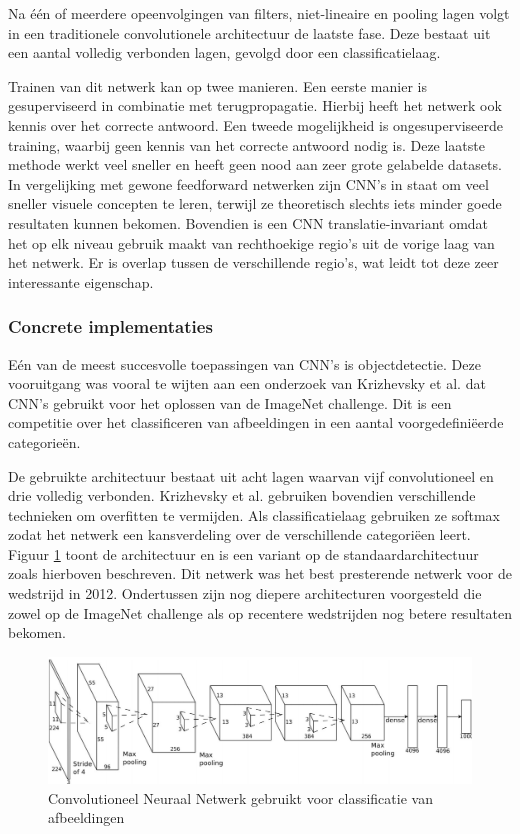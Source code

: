 Na \'e\'en of meerdere opeenvolgingen van filters, niet-lineaire en pooling lagen volgt in een traditionele convolutionele architectuur de laatste fase. Deze bestaat uit een aantal volledig verbonden lagen, gevolgd door een classificatielaag.

Trainen van dit netwerk kan op twee manieren. Een eerste manier is gesuperviseerd in combinatie met terugpropagatie. Hierbij heeft het netwerk ook kennis over het correcte antwoord. Een tweede mogelijkheid is ongesuperviseerde training, waarbij geen kennis van het correcte antwoord nodig is. Deze laatste methode werkt veel sneller en heeft geen nood aan zeer grote gelabelde datasets. 
In vergelijking met gewone feedforward netwerken zijn CNN's in staat om veel sneller visuele concepten te leren, terwijl ze theoretisch slechts iets minder goede resultaten kunnen bekomen.
Bovendien is een CNN translatie-invariant omdat het op elk niveau gebruik maakt van rechthoekige regio's uit de vorige laag van het netwerk. Er is overlap tussen de verschillende regio's, wat leidt tot deze zeer interessante eigenschap.

\subsubsection[]{Concrete implementaties}
E\'en van de meest succesvolle toepassingen van CNN's is objectdetectie. Deze vooruitgang was vooral te wijten aan een onderzoek van Krizhevsky et al.\cite{Krizhevsky2012a} dat CNN's gebruikt voor het oplossen van de ImageNet challenge\cite{Russakovsky2014}.
Dit is een competitie over het classificeren van afbeeldingen in een aantal voorgedefini\"eerde categorie\"en. 

De gebruikte architectuur bestaat uit acht lagen waarvan vijf convolutioneel en drie volledig verbonden. Krizhevsky et al. gebruiken bovendien verschillende technieken om overfitten te vermijden. Als classificatielaag gebruiken ze softmax zodat het netwerk een kansverdeling over de verschillende categori\"een leert. Figuur \ref{fig:AlexNet} toont de architectuur en  is een variant op de standaardarchitectuur zoals hierboven beschreven. Dit netwerk was het best presterende netwerk voor de wedstrijd in 2012. Ondertussen zijn nog diepere architecturen voorgesteld die zowel op de ImageNet challenge als op recentere wedstrijden nog betere resultaten bekomen.

\begin{figure}[tb]
	\centering
	\includegraphics[width=\linewidth]{Images/cnn.PNG}
	\caption{Convolutioneel Neuraal Netwerk gebruikt voor classificatie van afbeeldingen\cite{Krizhevsky2012a}}
	\label{fig:AlexNet}
\end{figure}

